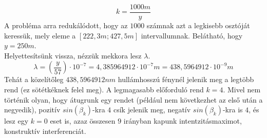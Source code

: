 \documentclass[11pt,a4paper,openany,leqno]{article}
\begin{document}
$$ k = \frac{1000m}{y} $$\indent
A probléma arra redukálódott, hogy az $1000$ számnak azt a legkisebb osztóját keressük, mely eleme a $[222,3m;427,5m]$ intervallumnak. Belátható, hogy $y=250m$.\\ \indent
Helyettesítsünk vissza, nézzük mekkora lesz $\lambda$.\\
$$ \lambda = (\frac{y}{57})\cdot 10^{-7} = 4,385964912 \cdot 10^{-7}m = 438,5964912 \cdot 10^{-9}m $$\indent
Tehát a közelítőleg $438,5964912 nm$ hullámhosszú fénynél jelenik meg a legtöbb rend (ez sötétkéknek felel meg). A legmagasabb előforduló rend $k=4$. Mivel nem történik olyan, hogy átugrunk egy rendet (például nem következhet az első után a negyedik), pozitív $sin(\beta_k)$-kra $4$ csík jelenik meg, negatív $sin(\beta_k)$-kra is $4$, és lesz egy $k=0$ eset is, azaz összesen $9$ irányban kapunk intentzitásmaximot, konstruktív interferenciát.
\end{document}
